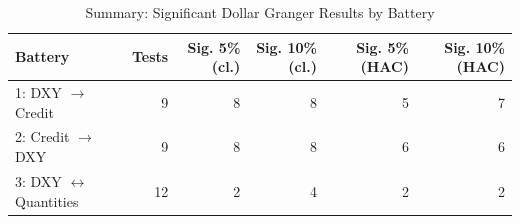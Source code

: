 \begin{table}[H]
\centering
\begin{tabular}{lrrrrr}
  \toprule
Battery & Tests & Sig. 5\% (cl.) & Sig. 10\% (cl.) & Sig. 5\% (HAC) & Sig. 10\% (HAC) \\ 
  \midrule
1: DXY $\rightarrow$ Credit & 9 & 8 & 8 & 5 & 7 \\
  2: Credit $\rightarrow$ DXY & 9 & 8 & 8 & 6 & 6 \\
  3: DXY $\leftrightarrow$ Quantities & 12 & 2 & 4 & 2 & 2 \\ 
   \bottomrule
\end{tabular}
\caption{Summary: Significant Dollar Granger Results by Battery} 
\label{tab:summary_dollar}
\end{table}
